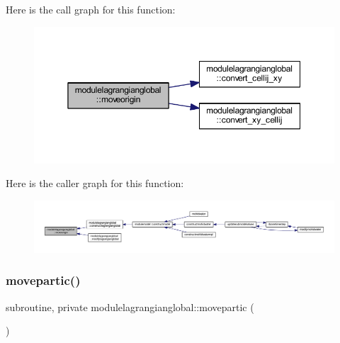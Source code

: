 Here is the call graph for this function\+:\nopagebreak
\begin{figure}[H]
\begin{center}
\leavevmode
\includegraphics[width=350pt]{namespacemodulelagrangianglobal_a214f6221918e0904f9300fa3b9a00cb3_cgraph}
\end{center}
\end{figure}
Here is the caller graph for this function\+:\nopagebreak
\begin{figure}[H]
\begin{center}
\leavevmode
\includegraphics[width=350pt]{namespacemodulelagrangianglobal_a214f6221918e0904f9300fa3b9a00cb3_icgraph}
\end{center}
\end{figure}
\mbox{\label{namespacemodulelagrangianglobal_a82279a8ab7ce219fe5a1bfff091e611f}} 
\subsubsection{\texorpdfstring{movepartic()}{movepartic()}}
{\footnotesize\ttfamily subroutine, private modulelagrangianglobal\+::movepartic (\begin{DoxyParamCaption}{ }\end{DoxyParamCaption})\hspace{0.3cm}{\ttfamily [private]}}

